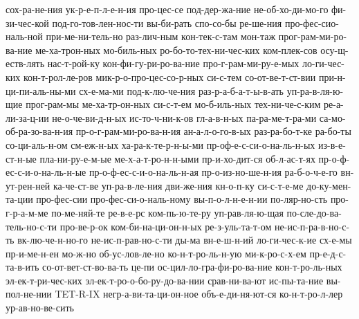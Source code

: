 {    сох-ра-не-ния
    ук-р-е-п-л-е-н-ия
    про-цес-се
    под-дер-жа-ние
    не-об-хо-ди-мо-го
    фи-зи-чес-кой
    под-го-тов-лен-нос-ти
    вы-би-рать
    спо-со-бы
    ре-ше-ния
    про-фес-сио-наль-ной
    при-ме-ни-тель-но
    раз-лич-ным
    кон-тек-с-там
    мон-таж
    прог-рам-ми-ро-ва-ние
    ме-ха-трон-ных
    мо-биль-ных
    ро-бо-то-тех-ни-чес-ких
    ком-плек-сов
    осу-щ-еств-лять
    нас-т-рой-ку
    кон-фи-гу-ри-ро-ва-ние
    про-г-рам-ми-ру-е-мых
    ло-ги-чес-ких
    кон-т-рол-ле-ров
    мик-р-о-про-цес-со-р-ных
    си-с-тем
    со-от-ве-т-ст-вии
    при-н-ци-пи-аль-ны-ми
    сх-е-ма-ми
    под-к-лю-че-ния
    раз-р-а-б-а-т-ы-в-ать
    уп-ра-в-ля-ю-щие
    прог-рам-мы
    ме-ха-тр-он-ных
    си-с-т-ем
    мо-б-иль-ных
    тех-ни-че-с-ким
    ре-а-ли-за-ц-ии
    не-о-че-ви-д-н-ых
    ис-то-ч-ни-к-ов
    гл-а-в-н-ых
    па-ра-ме-т-ра-ми
    са-мо-об-ра-зо-ва-н-ия
    пр-о-г-рам-ми-ро-ва-н-ия
    ан-а-л-о-го-в-ых
    раз-ра-бо-т-ке
    ра-бо-ты
    со-ци-аль-н-ом
    см-еж-н-ых
    ха-ра-к-те-р-н-ы-ми
    пр-оф-е-с-си-о-на-ль-н-ых
    из-в-е-ст-н-ые
    пла-ни-ру-е-м-ые
    ме-х-а-т-ро-н-н-ыми
    пр-и-хо-дит-ся
    об-л-ас-т-ях
    пр-о-ф-ес-с-и-о-на-ль-н-ые
    пр-о-ф-ес-с-и-о-на-ль-н-ая
    пр-о-из-но-ше-н-ия
    ра-б-о-ч-е-го
    вн-ут-рен-ней
    ка-че-ст-ве
    уп-ра-в-ле-ния
    дви-же-ния
    кн-о-п-ку
    си-с-т-е-ме
    до-ку-мен-та-ции
    про-фес-сии
    про-фес-си-о-наль-ному
    вы-п-о-л-н-е-н-ии
    по-ляр-но-сть
    про-г-р-а-м-ме
    по-ме-няй-те
    ре-в-е-рс
    ком-пь-ю-те-ру
    уп-рав-ля-ю-щая
    по-сле-до-ва-тель-но-с-ти
    про-ве-р-ок
    ком-би-на-ци-он-н-ых
    ре-з-уль-та-т-ом
    не-ис-п-ра-в-но-с-ть
    вк-лю-че-н-но-го
    не-ис-п-рав-но-с-ти
    ды-ма
    вн-е-ш-н-ий
    ло-ги-чес-к-ие
    сх-е-мы
    пр-и-ме-н-ен
    мо-ж-но
    об-ус-лов-ле-но
    ко-н-т-ро-ль-н-ую
    ми-к-ро-с-х-ем
    пр-е-д-с-та-в-ить
    со-от-вет-ст-во-ва-ть
    це-пи
    ос-цил-ло-гра-фи-ро-ва-ние
    кон-т-ро-ль-ных
    эл-ек-т-ри-чес-ких
    эл-ек-т-ро-о-бо-ру-до-ва-нии
    срав-ни-ва-ют
    ис-пы-та-ние
    вы-пол-не-нии
    TET-R-IX
    негр-а-ви-та-ци-он-ное
    объ-е-ди-ня-ют-ся
    ко-н-т-ро-л-лер
    ур-ав-но-ве-сить
    }